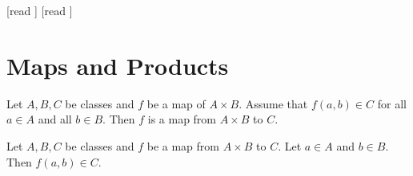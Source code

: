 \documentclass[10pt]{article}
\begin{document}
  \begin{imports}
    \begin{forthel}
      [read ]
      [read ]
    \end{forthel}
  \end{imports}


  \section*{Maps and Products}

  \begin{forthel}
    \begin{proposition}[id=FOUNDATIONS_06_2754759509409792,printid]
      Let $A, B, C$ be classes and $f$ be a map of $A \times B$.
      Assume that $f(a,b) \in C$ for all $a \in A$ and all $b \in B$.
      Then $f$ is a map from $A \times B$ to $C$.
    \end{proposition}
  \end{forthel}

  \begin{forthel}
    \begin{proposition}[id=FOUNDATIONS_06_2304295212941312,printid]
      Let $A, B, C$ be classes and $f$ be a map from $A \times B$ to $C$.
      Let $a \in A$ and $b \in B$.
      Then $f(a,b) \in C$.
    \end{proposition}
  \end{forthel}
\end{document}

